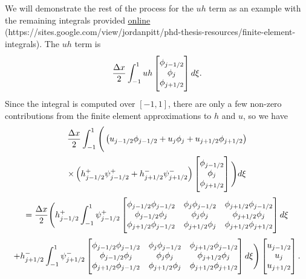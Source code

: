 We will demonstrate the rest of the process for the $uh$ term as an example with the remaining integrals provided \href{https://sites.google.com/view/jordanpitt/phd-thesis-resources/finite-element-integrals}{\color{blue}\underline{online}} (https://sites.google.com/view/jordanpitt/phd-thesis-resources/finite-element-integrals).
The $uh$ term is 
\begin{equation*}
\frac{\Delta x}{2}\int_{-1 }^{1} uh \begin{bmatrix} \TM
\phi_{j-1/2}\\\phi_j \\\phi_{j+1/2} \BM
\end{bmatrix} d\xi.
\end{equation*}
Since the integral is computed over $\left[-1,1\right]$, there are only a few non-zero contributions from the finite element approximations to $h$ and $u$, so we have
\begin{multline*}
\frac{\Delta x}{2}\int_{-1 }^{1}  \Bigg( \left(u_{j-1/2}\phi_{j-1/2} + u_{j}\phi_{j} + u_{j+1/2}\phi_{j+1/2}\right) \\ \times\left(h^+_{j-1/2}\psi^+_{j-1/2}  + h^-_{j+1/2}\psi^-_{j+1/2}\right) \begin{bmatrix} \TM
\phi_{j-1/2}\\\phi_j \\\phi_{j+1/2} \BM
\end{bmatrix} \Bigg) d\xi\\
=\frac{\Delta x}{2}\Bigg( h^+_{j-1/2} \int_{-1 }^{1} \psi^+_{j-1/2}  \begin{bmatrix} \TM
\phi_{j-1/2} \phi_{j-1/2} & \phi_{j}  \phi_{j-1/2}  & \phi_{j+1/2} \phi_{j-1/2}\\\phi_{j-1/2} \phi_{j} & \phi_{j} \phi_{j} &  \phi_{j + 1/2} \phi_{j}\\\phi_{j+1/2} \phi_{j-1/2} &  \phi_{j+1/2} \phi_{j} & \phi_{j+1/2} \phi_{j+1/2} \BM
\end{bmatrix} d\xi  \\ +  h^-_{j+1/2}\int_{-1 }^{1} \psi^-_{j+1/2} \begin{bmatrix} \TM
\phi_{j-1/2} \phi_{j-1/2} & \phi_{j}  \phi_{j-1/2}  & \phi_{j+1/2} \phi_{j-1/2}\\\phi_{j-1/2} \phi_{j} & \phi_{j} \phi_{j} &  \phi_{j + 1/2} \phi_{j}\\\phi_{j+1/2} \phi_{j-1/2} &  \phi_{j+1/2} \phi_{j} & \phi_{j+1/2} \phi_{j+1/2} \BM
\end{bmatrix} d\xi \Bigg)  \begin{bmatrix} \TM
u_{j-1/2}\\u_j \\u _{j+1/2} \BM
\end{bmatrix}.
\end{multline*}

